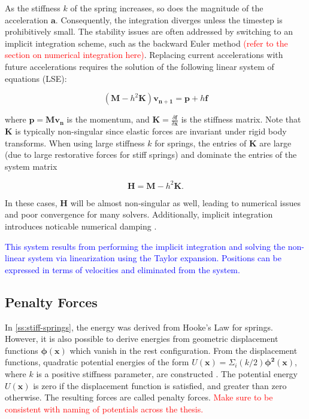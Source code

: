 As the stiffness $k$ of the spring increases, so does the magnitude of the acceleration $\bm{a}$. Consequently, the integration
diverges unless the timestep is prohibitively small. The stability issues are often addressed by switching to an implicit 
integration scheme, such as the backward Euler method \cite{baraff1998} \textcolor{red}{(refer to the section on numerical 
integration here)}. Replacing current accelerations with future accelerations requires the solution of the following linear 
system of equations (LSE):

\[
    (\bm{M} - h^2\bm{K})\bm{v_{n+1}} = \bm{p} + h\bm{f}
\]

where $\bm{p} = \bm{Mv_n}$ is the momentum, and $\bm{K} = \frac{\delta \bm{f}}{\delta \bm{x}}$ is the stiffness matrix. Note that 
$\bm{K}$ is typically non-singular since elastic forces are invariant under rigid body transforms. When using large stiffness 
$k$ for springs, the entries of $\bm{K}$ are large (due to large restorative forces for stiff springs) and dominate the entries 
of the system matrix 

\begin{equation}\label{eq:system-H}
    \bm{H} = \bm{M} - h^2\bm{K}.
\end{equation}

In these cases, $\bm{H}$ will be almost non-singular as well, leading to numerical issues and poor convergence for many solvers. 
Additionally, implicit integration introduces noticable numerical damping \cite{servin2006}.

\textcolor{blue}{This system results from performing the implicit integration and solving the non-linear system via linearization
using the Taylor expansion. Positions can be expressed in terms of velocities and eliminated from the system.}

\subsection{Penalty Forces}\label{ss:penalty-forces}
In \cref{ss:stiff-springs}, the energy was derived from Hooke's Law for springs. However, it is also possible to derive energies from 
geometric displacement functions $\bm{\phi(x)}$ which vanish in the rest configuration. From the displacement functions, quadratic 
potential energies of the form $U(\bm{x}) = \Sigma_i (k / 2) \bm{\phi^2(x)}$, where $k$ is a positive stiffness parameter, are 
constructed \cite{terz1987}. The potential energy $U(\bm{x})$ is zero if the displacement function is satisfied, and greater than 
zero otherwise. The resulting forces are called penalty forces. \textcolor{red}{Make sure to be consistent with naming of potentials
across the thesis.}

